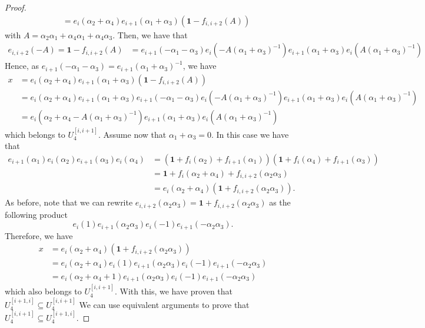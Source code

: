 \documentclass[11pt,letterpaper]{amsart}
\begin{document}
\begin{proof}
\begin{align*}
        & = e_{i}(\alpha_2+\alpha_4)e_{i+1}(\alpha_1+\alpha_3)(\mathbf{1} - f_{i,i+2}(A))  
    \end{align*}
    with $A = \alpha_2\alpha_1 + \alpha_4\alpha_1+\alpha_4\alpha_3$.
    Then, we have that 
    \begin{align*}
        e_{i,i+2}(-A) = \mathbf{1} - f_{i,i+2}(A) &= e_{i+1}(-\alpha_1-\alpha_3)e_i(-A(\alpha_1+\alpha_3)^{-1}) e_{i+1}(\alpha_1+\alpha_3)e_i(A(\alpha_1+\alpha_3)^{-1})
    \end{align*}
    Hence, as $e_{i+1}(-\alpha_1-\alpha_3) = e_{i+1}(\alpha_1+\alpha_3)^{-1}$, we have
\begin{align*}
        x&= e_{i}(\alpha_2+\alpha_4)e_{i+1}(\alpha_1+\alpha_3)(\mathbf{1} - f_{i,i+2}(A))\\
        &= e_{i}(\alpha_2+\alpha_4)e_{i+1}(\alpha_1+\alpha_3)e_{i+1}(-\alpha_1-\alpha_3)e_i(-A(\alpha_1+\alpha_3)^{-1}) e_{i+1}(\alpha_1+\alpha_3)e_i(A(\alpha_1+\alpha_3)^{-1})\\
        &= e_{i}(\alpha_2+\alpha_4-A(\alpha_1+\alpha_3)^{-1}) e_{i+1}(\alpha_1+\alpha_3)e_i(A(\alpha_1+\alpha_3)^{-1})
    \end{align*}
which belongs to $U_4^{[i,i+1]}$.
Assume now that $\alpha_1+\alpha_3=0$. In this case we have that 
\begin{align*}
e_{i+1}(\alpha_1)e_{i}(\alpha_2)e_{i+1}(\alpha_3)e_i(\alpha_4) &= (\mathbf{1}+f_i(\alpha_2)+f_{i+1}(\alpha_1))(\mathbf{1}+f_i(\alpha_4)+f_{i+1}(\alpha_3))\\
        &= \mathbf{1} + f_i(\alpha_2+\alpha_4) + f_{i,i+2}(\alpha_2\alpha_3)\\
        & = e_{i}(\alpha_2+\alpha_4)(\mathbf{1} + f_{i,i+2}(\alpha_2\alpha_3)).  
    \end{align*}
    As before, note that we can rewrite $e_{i,i+2}(\alpha_2\alpha_3)= \mathbf{1} + f_{i,i+2}(\alpha_2\alpha_3)$ as the following product $$e_{i}(1)e_{i+1}(\alpha_2\alpha_3)e_i(-1)e_{i+1}(-\alpha_2\alpha_3).$$
    Therefore, we have
\begin{align*}
        x&= e_{i}(\alpha_2+\alpha_4)(\mathbf{1} + f_{i,i+2}(\alpha_2\alpha_3))\\
        &= e_{i}(\alpha_2+\alpha_4)e_{i}(1)e_{i+1}(\alpha_2\alpha_3)e_i(-1)e_{i+1}(-\alpha_2\alpha_3)\\
        &= e_{i}(\alpha_2+\alpha_4+1)e_{i+1}(\alpha_2\alpha_3)e_i(-1)e_{i+1}(-\alpha_2\alpha_3)
    \end{align*}
which also belongs to $U_4^{[i,i+1]}$.
With this, we have proven that $U^{[i+1,i]}_4\subseteq U^{[i,i+1]}_4$
We can use equivalent arguments to prove that $U^{[i,i+1]}_4\subseteq U^{[i+1,i]}_4$.
    


\end{proof}
\end{document}
